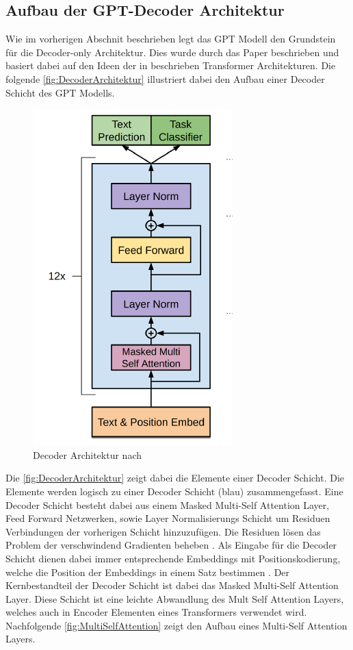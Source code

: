 \documentclass[conference]{IEEEtran}
\begin{document}
\subsection{Aufbau der GPT-Decoder Architektur}
Wie im vorherigen Abschnit beschrieben legt das GPT Modell den Grundstein für die Decoder-only Architektur. Dies wurde durch das Paper \cite{radfordImprovingLanguageUnderstanding} beschrieben und basiert dabei auf den Ideen der in \cite{vaswaniAttentionAllYou2023} beschrieben Transformer Architekturen. Die 
folgende \autoref{fig:DecoderArchitektur} illustriert dabei den Aufbau einer Decoder Schicht des GPT Modells.
\begin{figure}[htbp]
    \centerline{\includegraphics[width=0.4\linewidth]{Bilder/DecoderArchitekturGPT.png}}
    \caption{Decoder Architektur nach \cite{radfordImprovingLanguageUnderstanding}}
    \label{fig:DecoderArchitektur}
\end{figure}
Die \autoref{fig:DecoderArchitektur} zeigt dabei die Elemente einer Decoder Schicht. Die Elemente werden logisch zu einer Decoder Schicht (blau) zusammengefasst. Eine Decoder Schicht besteht dabei aus einem Masked Multi-Self Attention Layer, Feed Forward Netzwerken, sowie Layer Normalisierungs Schicht um  Residuen Verbindungen der vorherigen Schicht hinzuzufügen. Die Residuen lösen das Problem der verschwindend Gradienten beheben \cite{WieTransformatorenFunktionieren}. Als Eingabe für die Decoder Schicht dienen dabei immer entsprechende Embeddings mit Positionskodierung, welche die Position der Embeddings in einem Satz bestimmen \cite{WieTransformatorenFunktionieren}.
Der Kernbestandteil der Decoder Schicht ist dabei das Masked Multi-Self Attention Layer. Diese Schicht ist eine leichte Abwandlung des Mult Self Attention Layers, welches auch in Encoder Elementen eines Transformers verwendet wird. Nachfolgende \autoref{fig:MultiSelfAttention} zeigt den Aufbau eines Multi-Self Attention Layers.
\end{document}
